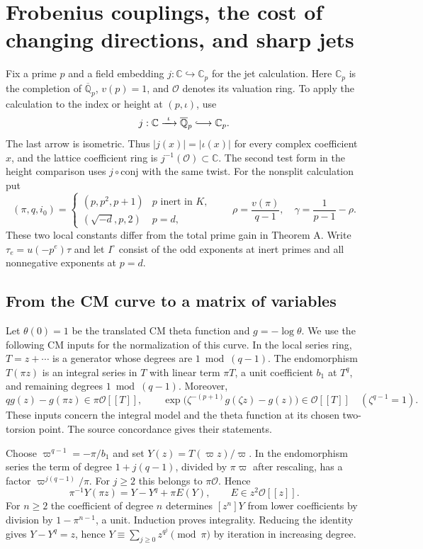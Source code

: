 \section{Frobenius couplings, the cost of changing directions, and sharp jets}\label{sec:jets}

Fix a prime $p$ and a field embedding $j:\mathbb C\hookrightarrow\mathbb C_p$ for the jet calculation. Here $\mathbb C_p$ is the completion of $\overline{\mathbb Q}_p$, $v(p)=1$, and $\mathcal O$ denotes its valuation ring. To apply the calculation to the index or height at $(p,\iota)$, use
\[
 j:\mathbb C\xrightarrow{\ \iota\ }\overline{\mathbb Q}_p
       \lhook\joinrel\longrightarrow\mathbb C_p.
\]
The last arrow is isometric. Thus $|j(x)|=|\iota(x)|$ for every complex coefficient $x$, and the lattice coefficient ring is $j^{-1}(\mathcal O)\subset\mathbb C$. The second test form in the height comparison uses $j\circ\mathrm{conj}$ with the same twist. For the nonsplit calculation put
\[
 (\pi,q,i_0)=
 \begin{cases}
 (p,p^2,p+1)&p\text{ inert in } K,\\
 (\sqrt{-d},p,2)&p=d,
 \end{cases}
 \qquad \rho=\frac{v(\pi)}{q-1},\quad
 \gamma=\frac1{p-1}-\rho .
\]
These two local constants differ from the total prime gain in Theorem A.
Write $\tau_e=u(-p^e)\tau$ and let $I^\circ$ consist of the odd exponents at inert primes and all nonnegative exponents at $p=d$.

\subsection{From the CM curve to a matrix of variables}\label{jets:cm}
Let $\theta(0)=1$ be the translated CM theta function and $g=-\log\theta$.
We use the following CM inputs for the normalization of this curve. In the local
series ring, $T=z+\cdots$ is a generator whose degrees are $1\bmod(q-1)$.
The endomorphism $T(\pi z)$ is an integral series in $T$ with linear term
$\pi T$, a unit coefficient $b_1$ at $T^q$, and remaining degrees
$1\bmod(q-1)$. Moreover,
\[
 qg(z)-g(\pi z)\in\pi\mathcal O[[T]],\qquad
 \exp\!\big(\zeta^{-(p+1)}g(\zeta z)-g(z)\big)\in\mathcal O[[T]]
 \quad(\zeta^{q-1}=1).
\]
These inputs concern the integral model and the theta function at its chosen
two-torsion point. The source concordance gives their statements.

Choose $\varpi^{q-1}=-\pi/b_1$ and set $Y(z)=T(\varpi z)/\varpi$.
In the endomorphism series the term of degree $1+j(q-1)$, divided by
$\pi\varpi$ after rescaling, has a factor $\varpi^{j(q-1)}/\pi$.
For $j\ge2$ this belongs to $\pi\mathcal O$. Hence
\[
 \pi^{-1}Y(\pi z)=Y-Y^q+\pi E(Y),\qquad E\in z^2\mathcal O[[z]] .
\]
For $n\ge2$ the coefficient of degree $n$ determines $[z^n]Y$ from lower coefficients by division by $1-\pi^{n-1}$, a unit. Induction proves integrality. Reducing the identity gives $Y-Y^q=z$, hence
$Y\equiv\sum_{j\ge0}z^{q^j}\pmod{\pi}$ by iteration in increasing degree.

